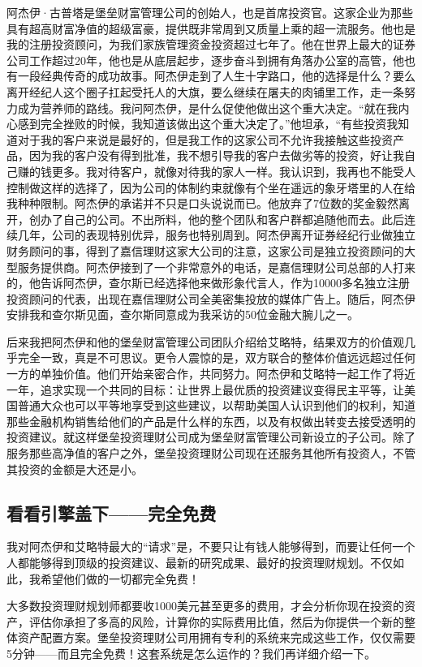阿杰伊·古普塔是堡垒财富管理公司的创始人，也是首席投资官。这家企业为那些具有超高财富净值的超级富豪，提供既非常周到又质量上乘的超一流服务。他也是我的注册投资顾问，为我们家族管理资金投资超过七年了。他在世界上最大的证券公司工作超过20年，他也是从底层起步，逐步奋斗到拥有角落办公室的高管，他也有一段经典传奇的成功故事。阿杰伊走到了人生十字路口，他的选择是什么？要么离开经纪人这个圈子扛起受托人的大旗，要么继续在屠夫的肉铺里工作，走一条努力成为营养师的路线。我问阿杰伊，是什么促使他做出这个重大决定。“就在我内心感到完全挫败的时候，我知道该做出这个重大决定了。”他坦承，“有些投资我知道对于我的客户来说是最好的，但是我工作的这家公司不允许我接触这些投资产品，因为我的客户没有得到批准，我不想引导我的客户去做劣等的投资，好让我自己赚的钱更多。我对待客户，就像对待我的家人一样。我认识到，我再也不能受人控制做这样的选择了，因为公司的体制约束就像有个坐在遥远的象牙塔里的人在给我种种限制。阿杰伊的承诺并不只是口头说说而已。他放弃了7位数的奖金毅然离开，创办了自己的公司。不出所料，他的整个团队和客户群都追随他而去。此后连续几年，公司的表现特别优异，服务也特别周到。阿杰伊离开证券经纪行业做独立财务顾问的事，得到了嘉信理财这家大公司的注意，这家公司是独立投资顾问的大型服务提供商。阿杰伊接到了一个非常意外的电话，是嘉信理财公司总部的人打来的，他告诉阿杰伊，查尔斯已经选择他来做形象代言人，作为10000多名独立注册投资顾问的代表，出现在嘉信理财公司全美密集投放的媒体广告上。随后，阿杰伊安排我和查尔斯见面，查尔斯同意成为我采访的50位金融大腕儿之一。

后来我把阿杰伊和他的堡垒财富管理公司团队介绍给艾略特，结果双方的价值观几乎完全一致，真是不可思议。更令人震惊的是，双方联合的整体价值远远超过任何一方的单独价值。他们开始亲密合作，共同努力。阿杰伊和艾略特一起工作了将近一年，追求实现一个共同的目标：让世界上最优质的投资建议变得民主平等，让美国普通大众也可以平等地享受到这些建议，以帮助美国人认识到他们的权利，知道那些金融机构销售给他们的产品是什么样的东西，以及有权做出转变去接受透明的投资建议。就这样堡垒投资理财公司成为堡垒财富管理公司新设立的子公司。除了服务那些高净值的客户之外，堡垒投资理财公司现在还服务其他所有投资人，不管其投资的金额是大还是小。

\subsection{看看引擎盖下——完全免费}

我对阿杰伊和艾略特最大的“请求”是，不要只让有钱人能够得到，而要让任何一个人都能够得到顶级的投资建议、最新的研究成果、最好的投资理财规划。不仅如此，我希望他们做的一切都完全免费！

大多数投资理财规划师都要收1000美元甚至更多的费用，才会分析你现在投资的资产，评估你承担了多高的风险，计算你的实际费用比值，然后为你提供一个新的整体资产配置方案。堡垒投资理财公司用拥有专利的系统来完成这些工作，仅仅需要5分钟——而且完全免费！这套系统是怎么运作的？我们再详细介绍一下。

